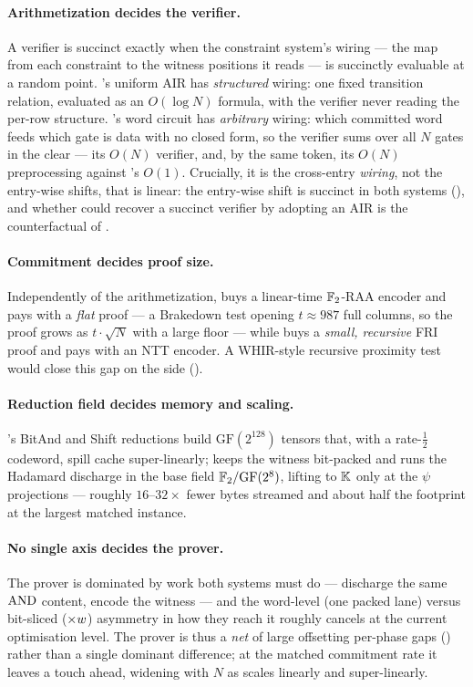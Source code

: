 \paragraph{Arithmetization decides the verifier.} A verifier is succinct
exactly when the constraint system's wiring --- the map from each constraint to
the witness positions it reads --- is succinctly evaluable at a random point.
\zinc{}'s uniform AIR has \emph{structured} wiring: one fixed transition
relation, evaluated as an $O(\log N)$ formula, with the verifier never reading
the per-row structure. \binius{}'s word circuit has \emph{arbitrary} wiring:
which committed word feeds which gate is data with no closed form, so the
verifier sums over all $N$ gates in the clear --- its $O(N)$ verifier, and, by
the same token, its $O(N)$ preprocessing against \zinc{}'s $O(1)$.
Crucially, it is the cross-entry \emph{wiring}, not the entry-wise shifts, that
is linear: the entry-wise shift is succinct in both systems
(), and whether \binius{} could recover a succinct verifier by
adopting an AIR is the counterfactual of .

\paragraph{Commitment decides proof size.} Independently of the
arithmetization, \zinc{} buys a linear-time $\mathbb{F}_2$-RAA encoder and pays with a
\emph{flat} proof --- a Brakedown test opening $t\approx 987$ full columns, so
the proof grows as $t\cdot\sqrt{N}$ with a large floor --- while \binius{} buys
a \emph{small, recursive} FRI proof and pays with an NTT encoder. A WHIR-style
recursive proximity test would close this gap on the \zinc{} side
().

\paragraph{Reduction field decides memory and scaling.} \binius{}'s BitAnd and
Shift reductions build $\mathrm{GF}(2^{128})$ tensors that, with a
rate-$\tfrac12$ codeword, spill cache super-linearly; \zinc{} keeps the witness
bit-packed and runs the Hadamard discharge in the base field
$\mathbb{F}_2/\mathrm{GF}(2^8)$, lifting to $\mathbb{K}$ only at the $\psi$ projections ---
roughly $16$--$32\times$ fewer bytes streamed and about half the footprint at
the largest matched instance.

\paragraph{No single axis decides the prover.} The prover is dominated by work
both systems must do --- discharge the same $\operatorname{AND}$ content, encode the witness
--- and the word-level (one packed lane) versus bit-sliced ($\times w$)
asymmetry in how they reach it roughly cancels at the current optimisation
level. The prover is thus a \emph{net} of large offsetting per-phase gaps
() rather than a single dominant difference; at the matched
commitment rate it leaves \zinc{} a touch ahead, widening with $N$ as \zinc{}
scales linearly and \binius{} super-linearly.

